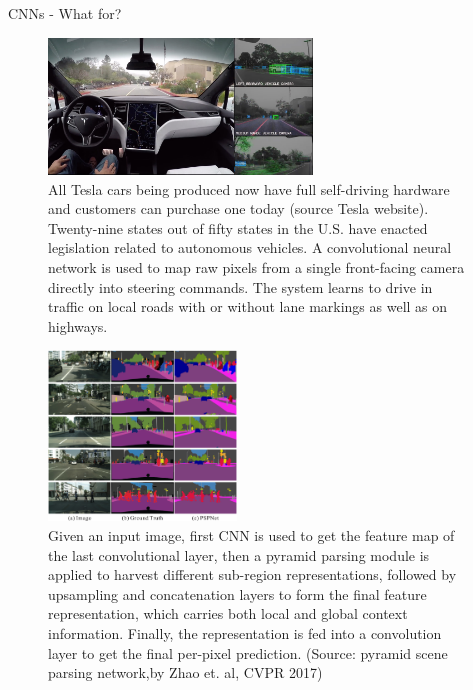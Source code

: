 \begin{vbframe}{CNNs - What for?}
  \begin{figure}
    \centering
    \includegraphics[width=7cm]{figure/tesla_autopilot.jpg}
    \caption{All Tesla cars being produced now have full self-driving hardware and customers can purchase one today (source Tesla website). Twenty-nine states out of fifty states in the U.S. have enacted legislation related to autonomous vehicles. A convolutional neural network is used to map raw pixels from a single front-facing camera directly into steering commands. The system learns to drive in traffic on local roads with or without lane markings as well as on highways.}
  \end{figure}
\framebreak

\begin{figure}
    \centering
    \includegraphics[width=5cm]{figure/cityscapes_visual.png}
    \caption{Given an input image, first CNN is used to get the feature map of the last convolutional layer, then a pyramid parsing module is applied to harvest different sub-region representations, followed by upsampling and concatenation layers to form the final feature representation, which carries both local and global context information. Finally, the representation is fed into a convolution layer to get the final per-pixel prediction. (Source: pyramid scene parsing network,by Zhao et. al, CVPR 2017) }%
  \end{figure}
\framebreak


\end{vbframe}
